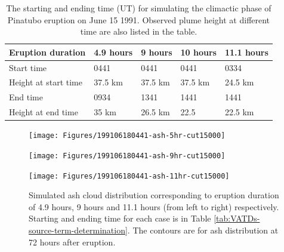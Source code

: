 \documentclass[draft,linenumbers]{agujournal2019}
\begin{document}
\begin{table}[htp]
\centering
\caption{The starting and ending time (UT) for simulating the climactic phase of Pinatubo eruption on June 15 1991. Observed plume height \citep{holasek1996satellite} at different time are also listed in the table.}		
	 \begin{tabular}{p{35mm}p{20mm}p{20mm}p{20mm}p{20mm}}
	 \hline
Eruption duration & 4.9 hours & 9 hours & 10 hours & 11.1 hours \\
	 \hline
	 Start time & 0441 & 0441 & 0441 & 0334 \\
	 Height at start time & 37.5 km & 37.5 km & 37.5 km & 24.5 km \\
	
	 End time & 0934 & 1341 & 1441 & 1441 \\
	 	Height at end time & 35 km & 26.5 km & 22.5 & 22.5 km \\
	 \hline
	 \end{tabular}
	 \label{tab:Pinatubo-eruption-duration}
\end{table}

\begin{figure}[!htb]
\centering
\begin{minipage}{.325\textwidth}
\centering
\texttt{[image: Figures/199106180441-ash-5hr-cut15000]}
\end{minipage}%
\begin{minipage}{.325 \textwidth}
\centering
\texttt{[image: Figures/199106180441-ash-9hr-cut15000]}
\end{minipage}%
\begin{minipage}{.325 \textwidth}
\centering
\texttt{[image: Figures/199106180441-ash-11hr-cut15000]}
\end{minipage}%
\caption{Simulated ash cloud distribution corresponding to eruption duration of 4.9 hours, 9 hours and 11.1 hours (from left to right) respectively. Starting and ending time for each case is in Table \ref{tab:VATDs-source-term-determination}. The contours are for ash distribution at 72 hours after eruption.}
\label{fig:Puff-sensitivity-duration}
\end{figure}
\end{document}
